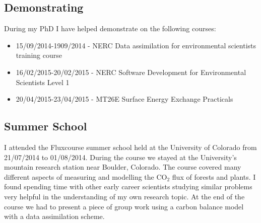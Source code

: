 \documentclass[11pt]{article}
\begin{document}
\subsection{Demonstrating}
During my PhD I have helped demonstrate on the following courses:
\begin{itemize}
\item 15/09/2014-1909/2014 - NERC Data assimilation for environmental scientists training course

\item 16/02/2015-20/02/2015 - NERC Software Development for Environmental Scientists Level 1

\item 20/04/2015-23/04/2015 - MT26E Surface Energy Exchange Practicals
\end{itemize}
\subsection{Summer School}
I attended the Fluxcourse summer school held at the University of Colorado from 21/07/2014 to 01/08/2014. During the course we stayed at the University's mountain research station near Boulder, Colorado. The course covered many different aspects of measuring and modelling the CO$_2$ flux of forests and plants. I found spending time with other early career scientists studying similar problems very helpful in the understanding of my own research topic. At the end of the course we had to present a piece of group work using a carbon balance model with a data assimilation scheme.


{}

\end{document}
